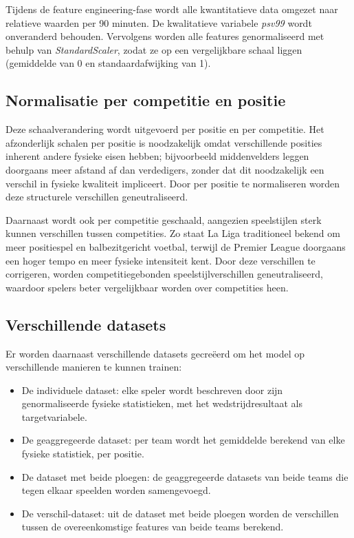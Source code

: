 Tijdens de feature engineering-fase wordt alle kwantitatieve data omgezet naar relatieve waarden per 90 minuten. De kwalitatieve variabele \emph{psv99} wordt onveranderd behouden. Vervolgens worden alle features genormaliseerd met behulp van \emph{StandardScaler}, zodat ze op een vergelijkbare schaal liggen (gemiddelde van 0 en standaardafwijking van 1).

\subsection{Normalisatie per competitie en positie}
Deze schaalverandering wordt uitgevoerd per positie en per competitie. Het afzonderlijk schalen per positie is noodzakelijk omdat verschillende posities inherent andere fysieke eisen hebben; bijvoorbeeld middenvelders leggen doorgaans meer afstand af dan verdedigers, zonder dat dit noodzakelijk een verschil in fysieke kwaliteit impliceert. Door per positie te normaliseren worden deze structurele verschillen geneutraliseerd.

Daarnaast wordt ook per competitie geschaald, aangezien speelstijlen sterk kunnen verschillen tussen competities. Zo staat La Liga traditioneel bekend om meer positiespel en balbezitgericht voetbal, terwijl de Premier League doorgaans een hoger tempo en meer fysieke intensiteit kent. Door deze verschillen te corrigeren, worden competitiegebonden speelstijlverschillen geneutraliseerd, waardoor spelers beter vergelijkbaar worden over competities heen.

\subsection{Verschillende datasets}

Er worden daarnaast verschillende datasets gecreëerd om het model op verschillende manieren te kunnen trainen:

\begin{itemize}
\item De individuele dataset: elke speler wordt beschreven door zijn genormaliseerde fysieke statistieken, met het wedstrijdresultaat als targetvariabele.
\item De geaggregeerde dataset: per team wordt het gemiddelde berekend van elke fysieke statistiek, per positie.
\item De dataset met beide ploegen: de geaggregeerde datasets van beide teams die tegen elkaar speelden worden samengevoegd.
\item De verschil-dataset: uit de dataset met beide ploegen worden de verschillen tussen de overeenkomstige features van beide teams berekend.
\end{itemize}


